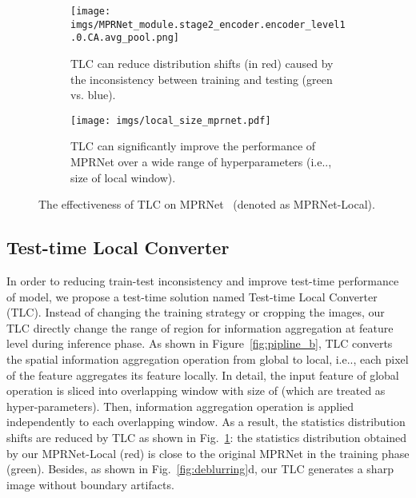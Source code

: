 \documentclass[runningheads]{llncs}
\makeatletter
\DeclareRobustCommand\onedot{\futurelet\@let@token\@onedot}
\def\@onedot{\ifx\@let@token.\else.\null\fi\xspace}
\def\ie{i.e\onedot}
\makeatother
\begin{document}
 \begin{figure}[t]
\centering
\begin{subfigure}[b]{0.48\columnwidth}
\centering
\texttt{[image: imgs/MPRNet\_module.stage2\_encoder.encoder\_level1.0.CA.avg\_pool.png]}
\caption{
TLC can reduce distribution shifts (in red) caused by the inconsistency between training and testing (green vs. blue).
}
\label{fig:distribution}
\end{subfigure}
\hfill
\begin{subfigure}[b]{0.50\columnwidth}
\centering
\texttt{[image: imgs/local\_size\_mprnet.pdf]}
\caption{TLC can significantly improve the performance of MPRNet over a wide range of hyperparameters (\ie, size of local window).
}
\label{fig:local_size}
\end{subfigure}
\vspace{-2mm}
\caption{
The effectiveness of TLC on MPRNet~\cite{Zamir2021MPRNet} (denoted as MPRNet-Local).
}
\label{fig:effectiveness_tlsc}
\end{figure} 



















\subsection{Test-time Local Converter}\label{sec:method:TLC}


In order to reducing train-test inconsistency and improve test-time performance of model, we propose a test-time solution named Test-time Local Converter (TLC).
Instead of changing the training strategy or cropping the images, our TLC directly change the range of region for information aggregation at feature level during inference phase. 
As shown in Figure~\ref{fig:pipline_b}, TLC converts the spatial information aggregation operation from global to local, \ie, each pixel of the feature aggregates its feature locally.
In detail, the input feature  of global operation is sliced into overlapping window with size of  (which are treated as hyper-parameters). Then, information aggregation operation is applied independently to each overlapping window. 
As a result, the statistics distribution shifts are reduced by TLC as shown in Fig.~\ref{fig:distribution}: the statistics distribution obtained by our MPRNet-Local (red) is close to the original MPRNet in the training phase (green). Besides, as shown in Fig.~\ref{fig:deblurring}d, our TLC generates a sharp image without boundary artifacts.
\end{document}
